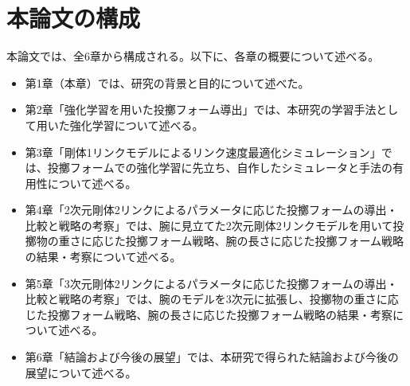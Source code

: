         \section{本論文の構成}
        本論文では、全6章から構成される。以下に、各章の概要について述べる。
        \begin{itemize}
          \item 第1章（本章）では、研究の背景と目的について述べた。
          \item 第2章「強化学習を用いた投擲フォーム導出」では、本研究の学習手法として用いた強化学習について述べる。
          \item 第3章「剛体1リンクモデルによるリンク速度最適化シミュレーション」では、投擲フォームでの強化学習に先立ち、自作したシミュレータと手法の有用性について述べる。
          \item 第4章「2次元剛体2リンクによるパラメータに応じた投擲フォームの導出・比較と戦略の考察」では、腕に見立てた2次元剛体2リンクモデルを用いて投擲物の重さに応じた投擲フォーム戦略、腕の長さに応じた投擲フォーム戦略の結果・考察について述べる。
          \item 第5章「3次元剛体2リンクによるパラメータに応じた投擲フォームの導出・比較と戦略の考察」では、腕のモデルを3次元に拡張し、投擲物の重さに応じた投擲フォーム戦略、腕の長さに応じた投擲フォーム戦略の結果・考察について述べる。
          \item 第6章「結論および今後の展望」では、本研究で得られた結論および今後の展望について述べる。
        \end{itemize}
